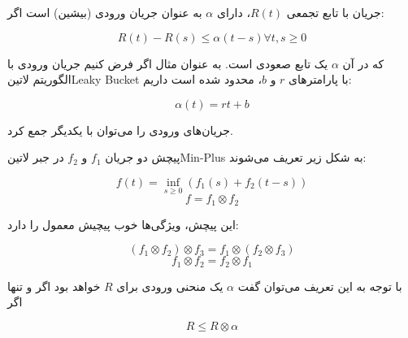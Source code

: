 
جریان با تابع تجمعی $R(t)$، دارای $\alpha$ به عنوان جریان ورودی (بیشین) است اگر:

\[
  R(t) - R(s) \le \alpha(t - s) \forall t,s \ge 0
\]

که در آن $\alpha$ یک تابع صعودی است. به عنوان مثال اگر فرض کنیم جریان ورودی با الگوریتم ‌لاتین{Leaky Bucket} با پارامترهای $r$ و $b$، محدود شده است داریم:

\[
  \alpha(t) = rt + b
\]

جریان‌های ورودی را می‌توان با یکدیگر جمع کرد.


پیچش دو جریان $f_{1}$ و $f_{2}$ در جبر ‌لاتین{Min-Plus} به شکل زیر تعریف می‌شوند:

\[
  f(t) = \inf_{s \ge 0}(f_{1}(s) + f_{2}(t-s))
\]
\[
  f = f_{1} \otimes f_{2}
\]

این پیچش، ویژگی‌ها خوب پیچیش معمول را دارد:

\[
  (f_{1} \otimes f_{2}) \otimes f_{3} = f_{1} \otimes (f_{2} \otimes f_{3})
\]
\[
  f_{1} \otimes f_{2} = f_{2} \otimes f_{1}
\]

با توجه به این تعریف می‌توان گفت $\alpha$ یک منحنی ورودی برای $R$ خواهد بود اگر و تنها اگر

\[
  R \le R \otimes \alpha
\]
